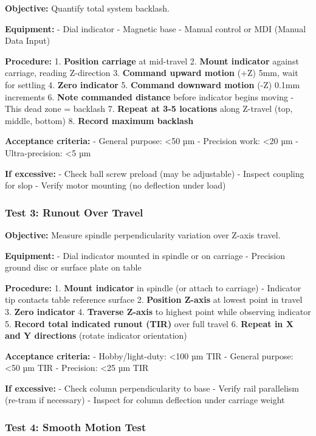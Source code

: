 \documentclass[
]{article}
\begin{document}
\textbf{Objective:} Quantify total system backlash.

\textbf{Equipment:} - Dial indicator - Magnetic base - Manual control or
MDI (Manual Data Input)

\textbf{Procedure:} 1. \textbf{Position carriage} at mid-travel 2.
\textbf{Mount indicator} against carriage, reading Z-direction 3.
\textbf{Command upward motion} (+Z) 5mm, wait for settling 4.
\textbf{Zero indicator} 5. \textbf{Command downward motion} (-Z) 0.1mm
increments 6. \textbf{Note commanded distance} before indicator begins
moving - This dead zone = backlash 7. \textbf{Repeat at 3-5 locations}
along Z-travel (top, middle, bottom) 8. \textbf{Record maximum backlash}

\textbf{Acceptance criteria:} - General purpose: \textless50 µm -
Precision work: \textless20 µm - Ultra-precision: \textless5 µm

\textbf{If excessive:} - Check ball screw preload (may be adjustable) -
Inspect coupling for slop - Verify motor mounting (no deflection under
load)

\subsubsection{Test 3: Runout Over
Travel}\label{test-3-runout-over-travel}

\textbf{Objective:} Measure spindle perpendicularity variation over
Z-axis travel.

\textbf{Equipment:} - Dial indicator mounted in spindle or on carriage -
Precision ground disc or surface plate on table

\textbf{Procedure:} 1. \textbf{Mount indicator} in spindle (or attach to
carriage) - Indicator tip contacts table reference surface 2.
\textbf{Position Z-axis} at lowest point in travel 3. \textbf{Zero
indicator} 4. \textbf{Traverse Z-axis} to highest point while observing
indicator 5. \textbf{Record total indicated runout (TIR)} over full
travel 6. \textbf{Repeat in X and Y directions} (rotate indicator
orientation)

\textbf{Acceptance criteria:} - Hobby/light-duty: \textless100 µm TIR -
General purpose: \textless50 µm TIR - Precision: \textless25 µm TIR

\textbf{If excessive:} - Check column perpendicularity to base - Verify
rail parallelism (re-tram if necessary) - Inspect for column deflection
under carriage weight

\subsubsection{Test 4: Smooth Motion
Test}\label{test-4-smooth-motion-test}
\end{document}
